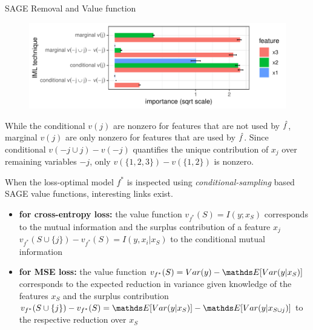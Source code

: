 \documentclass[11pt,compress,t,notes=noshow, xcolor=table]{beamer}
\begin{document}
\begin{vbframe}{SAGE Removal and Value function}
\begin{figure}
  \includegraphics[width=0.6\linewidth]{figure_man/sage_variants}
\end{figure}

While the conditional $v(j)$ are nonzero for features that are not used by $\fh$, marginal $v(j)$ are only nonzero for features that are used by $\fh$. Since conditional $v(-j \cup j) - v(-j)$ quantifies the unique contribution of $x_j$ over remaining variables $-j$, only $v(\{1,2,3\}) - v(\{1, 2\})$ is nonzero.

\framebreak

When the loss-optimal model $f^*$ is inspected using \textit{conditional-sampling} based SAGE value functions, interesting links exist.
\begin{itemize}
  \item \textbf{for cross-entropy loss:} the value function $v_{f^*}(S) = I(y;x_S)$ corresponds to the mutual information and the surplus contribution of a feature $x_j$ $v_{f^*}(S \cup \{j\}) - v_{f^*}(S) = I(y,x_i|x_S)$ to the conditional mutual information
  \item \textbf{for MSE loss:} the value function $v_{f^*}(S) = Var(y) - \E[Var(y|x_S)]$ corresponds to the expected reduction in variance given knowledge of the features $x_S$ and the surplus contribution $v_{f^*}(S \cup \{j\}) - v_{f^*}(S) = \E[Var(y|x_S)] - \E[Var(y|x_{S \cup {j}})]$ to the respective reduction over $x_S$
\end{itemize}

\end{vbframe}
\end{document}
